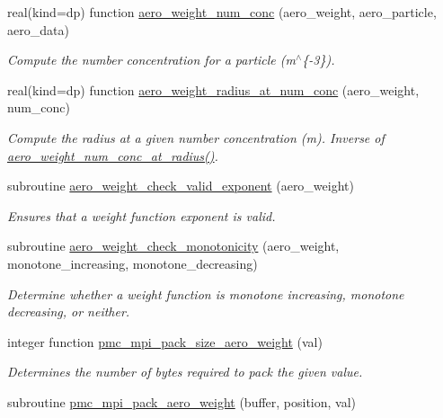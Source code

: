 \begin{DoxyCompactItemize}
real(kind=dp) function \mbox{\hyperlink{namespacepmc__aero__weight_a4c9196faee3f84f1c2b376a654c80672}{aero\+\_\+weight\+\_\+num\+\_\+conc}} (aero\+\_\+weight, aero\+\_\+particle, aero\+\_\+data)
\begin{DoxyCompactList}\small\item\em Compute the number concentration for a particle (m$^\wedge$\{-\/3\}). \end{DoxyCompactList}\item 
real(kind=dp) function \mbox{\hyperlink{namespacepmc__aero__weight_a2841f7615cd8713081672e3987c9f4eb}{aero\+\_\+weight\+\_\+radius\+\_\+at\+\_\+num\+\_\+conc}} (aero\+\_\+weight, num\+\_\+conc)
\begin{DoxyCompactList}\small\item\em Compute the radius at a given number concentration (m). Inverse of \mbox{\hyperlink{namespacepmc__aero__weight_aca13cabb919a67bd13c75333b7a8daa9}{aero\+\_\+weight\+\_\+num\+\_\+conc\+\_\+at\+\_\+radius()}}. \end{DoxyCompactList}\item 
subroutine \mbox{\hyperlink{namespacepmc__aero__weight_a02ac941390da0ba2aeff1eeaf75eb5ca}{aero\+\_\+weight\+\_\+check\+\_\+valid\+\_\+exponent}} (aero\+\_\+weight)
\begin{DoxyCompactList}\small\item\em Ensures that a weight function exponent is valid. \end{DoxyCompactList}\item 
subroutine \mbox{\hyperlink{namespacepmc__aero__weight_aec626ee7f60bda31b58bf46422376800}{aero\+\_\+weight\+\_\+check\+\_\+monotonicity}} (aero\+\_\+weight, monotone\+\_\+increasing, monotone\+\_\+decreasing)
\begin{DoxyCompactList}\small\item\em Determine whether a weight function is monotone increasing, monotone decreasing, or neither. \end{DoxyCompactList}\item 
integer function \mbox{\hyperlink{namespacepmc__aero__weight_af2fd9b3fdbd2c2a8ac472047c72d668e}{pmc\+\_\+mpi\+\_\+pack\+\_\+size\+\_\+aero\+\_\+weight}} (val)
\begin{DoxyCompactList}\small\item\em Determines the number of bytes required to pack the given value. \end{DoxyCompactList}\item 
subroutine \mbox{\hyperlink{namespacepmc__aero__weight_a953b171f04f27a0136788ebacd9471e8}{pmc\+\_\+mpi\+\_\+pack\+\_\+aero\+\_\+weight}} (buffer, position, val)

\end{DoxyCompactItemize}
